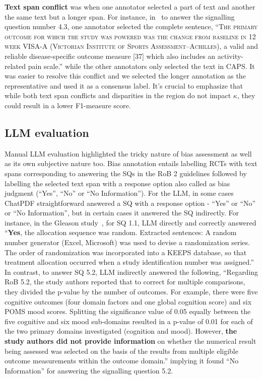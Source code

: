 \documentclass[sn-mathphys,Numbered]{sn-jnl}%
\theoremstyle{thmstyleone}%
\theoremstyle{thmstyletwo}%
\theoremstyle{thmstylethree}%
\begin{document}
\textbf{Text span conflict} was when one annotator selected a part of text and another the same text but a longer span.
For instance, in~\cite{solomons2020intramuscular} to answer the signalling question number 4.3, one annotator selected the complete sentence, ``\textsc{The primary outcome for which the study was powered was the change from baseline in 12 week VISA-A (Victorian Institute of Sports Assessment–Achilles),} a valid and reliable disease-specific outcome measure [37] which also includes an activity-related pain scale.'' while the other annotators only selected the text in CAPS. 
It was easier to resolve this conflict and we selected the longer annotation as the representative and used it as a consensus label.
It's crucial to emphasize that while both text span conflicts and disparities in the region do not impact $\kappa$, they could result in a lower F1-measure score.
%
%
%
\subsection{LLM evaluation}
\label{disc:llm}
%
Manual LLM evaluation highlighted the tricky nature of bias assessment as well as its own subjective nature too.
Bias annotation entails labelling RCTs with text spans corresponding to answering the SQs in the RoB 2 guidelines followed by labelling the selected text span with a response option also called as bias judgment (``Yes'', ``No'' or ``No Information'').
For the LLM, in some cases ChatPDF straightforward answered a SQ with a response option - ``Yes'' or ``No'' or ``No Information'', but in certain cases it answered the SQ indirectly.
For instance, in the Gleason study~\cite{gleason2015effects}, for SQ 1.1, LLM directly and correctly answered ``\textbf{Yes}, the allocation sequence was random. Extracted sentences: A random number generator (Excel, Microsoft) was used to devise a randomization series. The order of randomization was incorporated into a KEEPS database, so that treatment allocation occurred when a study identification number was assigned.''
In contrast, to answer SQ 5.2, LLM indirectly answered the following, ``Regarding RoB 5.2, the study authors reported that to correct for multiple comparisons, they divided the p-value by the number of outcomes. For example, there were five cognitive outcomes (four domain factors and one global cognition score) and six POMS mood scores. Splitting the significance value of 0.05 equally between the five cognitive and six mood sub-domains resulted in a p-value of 0.01 for each of the two primary domains investigated (cognition and mood). However, \textbf{the study authors did not provide information} on whether the numerical result being assessed was selected on the basis of the results from multiple eligible outcome measurements within the outcome domain.'' implying it found ``No Information'' for answering the signalling question 5.2.
\end{document}

